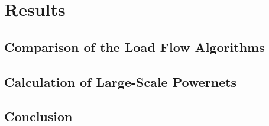 \chapter{Results}

\section{Comparison of the Load Flow Algorithms}
\label{sec:comparison_algorithms}

\section{Calculation of Large-Scale Powernets}
\label{sec:large_scale_powernets}

\section{Conclusion}